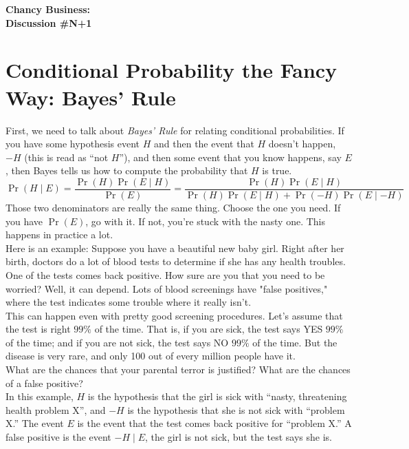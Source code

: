 \documentclass[10pt]{amsart}
\theoremstyle{definition}
\begin{document}
\begin{center}
\textbf{\Huge
Chancy Business:\\ Discussion \#{N+1}
}
\end{center}

\section{Conditional Probability the Fancy Way: Bayes' Rule}

First, we need to talk about \emph{Bayes' Rule} for relating conditional probabilities. If you have some hypothesis event $H$ and then the event that $H$ doesn't happen, $- H$ (this is read as ``not $H$''), and then some event that you know happens, say $E$, then Bayes tells us how to compute the probability that $H$ is true.
\[
\Pr(H\mid E) = \dfrac{\Pr(H)\Pr(E\mid H)}{\Pr(E)} = 
\dfrac{\Pr(H)\Pr(E\mid H)}{\Pr(H)\Pr(E\mid H)+ \Pr(- H)\Pr(E\mid - H)}
\]
Those two denominators are really the same thing. Choose the one you need. If you have $\Pr(E)$, go with it. If not, you're stuck with the nasty one. This happens in practice a lot. \\

Here is an example: Suppose you have a beautiful new baby girl. Right after her birth, doctors do a lot of blood tests to determine if she has any health troubles. One of the tests comes back positive. How sure are you that you need to be worried? Well, it can depend. Lots of blood screenings have "false positives," where the test indicates some trouble where it really isn't.\\

This can happen even with pretty good screening procedures. Let's assume that the test is right $99\%$ of the time. That is, if you are sick, the test says YES $99\%$ of the time; and if you are not sick, the test says NO $99\%$ of the time. But the disease is very rare, and only 100 out of every million people have it.\\

What are the chances that your parental terror is justified? What are the chances of a false positive?\\

In this example, $H$ is the hypothesis that the girl is sick with ``nasty, threatening health problem X'', and $-H$ is the hypothesis that she is not sick with ``problem X.'' The event $E$ is the event that the test comes back positive for ``problem X.''  A false positive is the event $-H\mid E$, the girl is not sick, but the test says she is.\\
\end{document}
